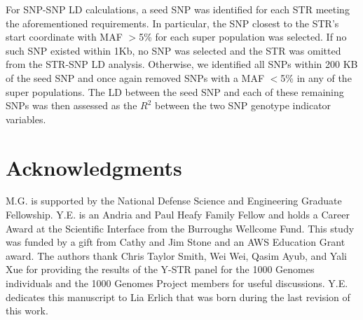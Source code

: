 For SNP-SNP LD calculations, a seed SNP was identified for each STR meeting the aforementioned requirements. In particular, the SNP closest to the STR's start coordinate with MAF $>$5\% for each super population was selected. If no such SNP existed within 1Kb, no SNP was selected and the STR was omitted from the STR-SNP LD analysis. Otherwise, we identified all SNPs within 200 KB of the seed SNP and once again removed SNPs with a MAF $<$5\% in any of the super populations. The LD between the seed SNP and each of these remaining SNPs was then assessed as the $R^2$ between the two SNP genotype indicator variables.  

\section{Acknowledgments}
M.G. is supported by the National Defense Science and Engineering Graduate Fellowship. Y.E. is an Andria and Paul Heafy Family Fellow and holds a Career Award at the Scientific Interface from the Burroughs Wellcome Fund. This study was funded by a gift from Cathy and Jim Stone and an AWS Education Grant award. The authors thank Chris Taylor Smith, Wei Wei, Qasim Ayub, and Yali Xue for providing the results of the Y-STR panel for the 1000 Genomes individuals and the 1000 Genomes Project members for useful discussions. Y.E. dedicates this manuscript to Lia Erlich that was born during the last revision of this work.